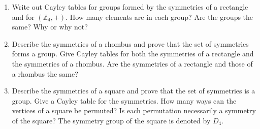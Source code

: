{\begin{enumerate}
\begin{minipage}[t]{4.6in}
\begin{minipage}[t]{2.25in}
\begin{itemize}
 
\end{itemize}
\end{minipage} \hfill
\begin{minipage}[t]{2.25in}
\begin{itemize}
 
 \item[{\bf (b)}]
 
 
 \item[{\bf (d)}]
 
 
\end{itemize}
\end{minipage}
\end{minipage}
 
\vspace{2pt}        %
 
\item   %
Write out Cayley tables for groups formed by the symmetries of a
rectangle and for $({\mathbb Z}_4, +)$. How many elements are in each
group? Are the groups the same? Why or why not? 
 
 
\item %
Describe the symmetries of a rhombus and prove that the set of
symmetries forms a group. Give Cayley tables for both the symmetries
of a rectangle and the symmetries of a rhombus. Are the symmetries of
a rectangle and those of a rhombus the same?
 
 
\item %
Describe the symmetries of a square and prove that the set of
symmetries is a group. Give a Cayley table for the symmetries. How
many ways can the vertices of a square be permuted?  Is each
permutation necessarily a symmetry of the square?  The symmetry group
of the square is denoted by $D_4$.
 

\end{enumerate}}
